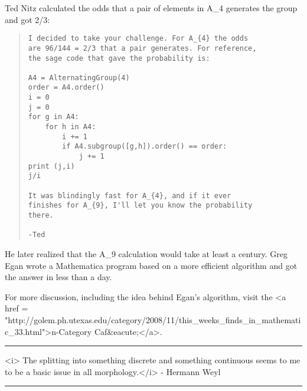 Ted Nitz calculated the odds that a pair of elements in 
A_{4} generates the group and got 2/3:

\begin{quote}
\begin{verbatim}
I decided to take your challenge. For A_{4} the odds 
are 96/144 = 2/3 that a pair generates. For reference, 
the sage code that gave the probability is:

A4 = AlternatingGroup(4)
order = A4.order()
i = 0
j = 0
for g in A4:
    for h in A4:
        i += 1
        if A4.subgroup([g,h]).order() == order:
            j += 1
print (j,i)
j/i

It was blindingly fast for A_{4}, and if it ever 
finishes for A_{9}, I'll let you know the probability 
there.

-Ted
\end{verbatim}
    
\end{quote}

He later realized that the A_{9} calculation would take at least
a century.  Greg Egan wrote a Mathematica program based on a more
efficient algorithm and got the answer in less than a day.

For more discussion, including the idea behind Egan's algorithm,
visit the <a href = "http://golem.ph.utexas.edu/category/2008/11/this_weeks_finds_in_mathematic_33.html">n-Category Caf&eacute;</a>.

\par\noindent\rule{\textwidth}{0.4pt}
<i>
The splitting into something discrete and something continuous
seems to me to be a basic issue in all morphology.</i> - Hermann Weyl

\par\noindent\rule{\textwidth}{0.4pt}

